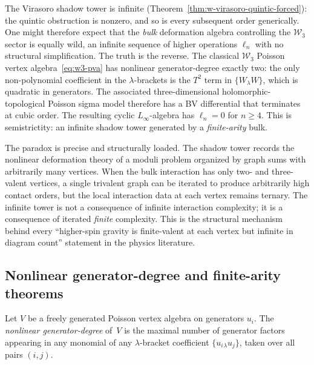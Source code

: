 The Virasoro shadow tower is infinite
(Theorem~\ref{thm:w-virasoro-quintic-forced}): the quintic
obstruction is nonzero, and so is every subsequent order
generically.  One might therefore expect that the \emph{bulk}
deformation algebra controlling the $\mathcal{W}_3$ sector is
equally wild, an infinite sequence of higher operations $\ell_n$
with no structural simplification.  The truth is the reverse.  The
classical $\mathcal{W}_3$ Poisson vertex
algebra~\eqref{eq:w3-pva} has nonlinear generator-degree exactly
two: the only non-polynomial coefficient in the $\lambda$-brackets
is the $T^2$ term in $\{W_\lambda W\}$, which is quadratic in
generators.  The associated three-dimensional
holomorphic-topological Poisson sigma model therefore has a BV
differential that terminates at cubic order.  The resulting cyclic
$L_\infty$-algebra has $\ell_n = 0$ for $n \ge 4$.  This is
semistrictity: an infinite shadow tower generated by a
\emph{finite-arity} bulk.

The paradox is precise and structurally loaded.  The shadow tower
records the nonlinear deformation theory of a moduli problem
organized by graph sums with arbitrarily many vertices.  When the
bulk interaction has only two- and three-valent vertices, a single
trivalent graph can be iterated to produce arbitrarily high contact
orders, but the local interaction data at each vertex remains
ternary.  The infinite tower is not a consequence of infinite
interaction complexity; it is a consequence of iterated
\emph{finite} complexity.  This is the structural mechanism behind
every ``higher-spin gravity is finite-valent at each vertex but
infinite in diagram count'' statement in the physics literature.

\subsection{Nonlinear generator-degree and finite-arity theorems}
\label{subsec:semistrict-finite-arity}

\begin{definition}
\label{def:w-nonlinear-generator-degree}
Let $V$ be a freely generated Poisson vertex algebra on generators
$u_i$.  The \emph{nonlinear generator-degree} of~$V$ is the maximal
number of generator factors appearing in any monomial of any
$\lambda$-bracket coefficient $\{u_i{}_\lambda u_j\}$, taken over all
pairs $(i,j)$.
\end{definition}

